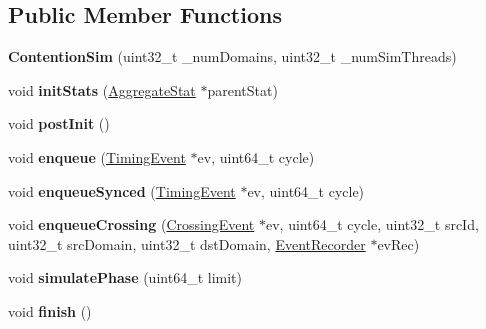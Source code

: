 \subsection*{Public Member Functions}
\begin{DoxyCompactItemize}
\item 
\hypertarget{classContentionSim_a4c7d65f216bc7cd5b4db0f4736d269d3}{{\bfseries Contention\-Sim} (uint32\-\_\-t \-\_\-num\-Domains, uint32\-\_\-t \-\_\-num\-Sim\-Threads)}\label{classContentionSim_a4c7d65f216bc7cd5b4db0f4736d269d3}

\item 
\hypertarget{classContentionSim_a43f3141595b3d9ea5e067ce8ce74d79c}{void {\bfseries init\-Stats} (\hyperlink{classAggregateStat}{Aggregate\-Stat} $\ast$parent\-Stat)}\label{classContentionSim_a43f3141595b3d9ea5e067ce8ce74d79c}

\item 
\hypertarget{classContentionSim_a5fc392e200bc8c0acada32e838420ecc}{void {\bfseries post\-Init} ()}\label{classContentionSim_a5fc392e200bc8c0acada32e838420ecc}

\item 
\hypertarget{classContentionSim_a1cd640e573094fb670fc8b83f4a07332}{void {\bfseries enqueue} (\hyperlink{classTimingEvent}{Timing\-Event} $\ast$ev, uint64\-\_\-t cycle)}\label{classContentionSim_a1cd640e573094fb670fc8b83f4a07332}

\item 
\hypertarget{classContentionSim_aade85cbc1438a43581a34036fc79bb12}{void {\bfseries enqueue\-Synced} (\hyperlink{classTimingEvent}{Timing\-Event} $\ast$ev, uint64\-\_\-t cycle)}\label{classContentionSim_aade85cbc1438a43581a34036fc79bb12}

\item 
\hypertarget{classContentionSim_a4c06e1040f29e473b080f80fb80b8230}{void {\bfseries enqueue\-Crossing} (\hyperlink{classCrossingEvent}{Crossing\-Event} $\ast$ev, uint64\-\_\-t cycle, uint32\-\_\-t src\-Id, uint32\-\_\-t src\-Domain, uint32\-\_\-t dst\-Domain, \hyperlink{classEventRecorder}{Event\-Recorder} $\ast$ev\-Rec)}\label{classContentionSim_a4c06e1040f29e473b080f80fb80b8230}

\item 
\hypertarget{classContentionSim_a961f4d3a18597d2413188a67cb800ee5}{void {\bfseries simulate\-Phase} (uint64\-\_\-t limit)}\label{classContentionSim_a961f4d3a18597d2413188a67cb800ee5}

\item 
\hypertarget{classContentionSim_a0d5aeadd8d3270a37ef7dcf79488621d}{void {\bfseries finish} ()}\label{classContentionSim_a0d5aeadd8d3270a37ef7dcf79488621d}


\end{DoxyCompactItemize}
